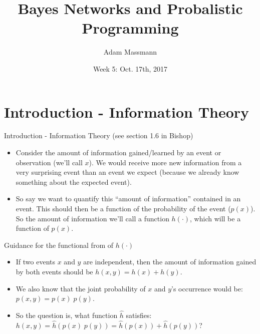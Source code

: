 \documentclass{beamer}
\title[Your Short Title]{Bayes Networks and Probalistic Programming}
\author{Adam Massmann}
\institute{Water Center NN Meetings}
\date{Week 5: Oct. 17th, 2017}
\begin{document}
\begin{frame}
  \titlepage
\end{frame}


\section{Introduction - Information Theory}

\begin{frame}{Introduction - Information Theory (see section 1.6 in Bishop)}
\begin{itemize}
\item Consider the amount of information gained/learned by an event or observation (we'll call $x$). We would receive more new information from a very surprising event than an event we expect (because we already know something about the expected event).
\item So say we want to quantify this ``amount of information'' contained in an event. This should then be a function of the probability of the event ($p(x)$). So the amount of information we'll call a function $h(\cdot )$, which will be a function of $p(x)$.
\end{itemize}

\end{frame}


\begin{frame}{Guidance for the functional from of $h(\cdot ) $}
\begin{itemize}
\item If two events $x$ and $y$ are independent, then the amount of information gained by both events should be $h(x,y) = h(x) + h(y)$.
\item We also know that the joint probability of $x$ and $y$'s occurrence would be: $p(x,y) = p(x) \; p(y)$.
  \item So the question is, what function $\hat{h}$ satisfies: $h(x,y) = \hat{h}(p(x)\; p(y)) = \hat{h}(p(x)) + \hat{h}(p(y))$?
\end{itemize}

\end{frame}
\end{document}
